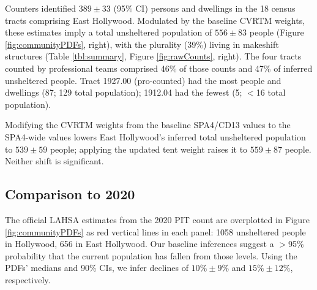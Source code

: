 \documentclass[11pt,twocolumn]{article}
\def\resp{respectively}
\def\dh{10\%\pm9\%}
\def\nce{389}
\def\ne{556\pm83}
\def\de{15\%\pm12\%}
\begin{document}
Counters identified $\nce\pm33$ (95\% CI) persons and dwellings in the 18 census tracts 
comprising East Hollywood. Modulated by the baseline CVRTM weights, these estimates imply 
a total unsheltered population of $\ne$ people (Figure \ref{fig:communityPDFs},
right), with the plurality (39\%) living in makeshift structures (Table \ref{tbl:summary}, 
Figure \ref{fig:rawCounts}, right). The four tracts counted by professional teams comprised 46\% of 
those counts and 47\% of inferred unsheltered people. Tract 1927.00 (pro-counted) had the 
most people and dwellings (87; 129 total population); 1912.04 had the fewest 
(5; $<$16 total population). 

Modifying the CVRTM weights from the baseline SPA4/CD13 values to the SPA4-wide values 
lowers East Hollywood's inferred total unsheltered population to $539\pm59$ people; applying
the updated tent weight raises it to $559\pm87$ people. Neither shift is significant.




\subsection{Comparison to 2020}
\label{sec:comp}

The official LAHSA estimates from the 2020 PIT count are overplotted in Figure \ref{fig:communityPDFs} 
as red vertical lines in each panel: 1058 unsheltered people in Hollywood, 656 in East Hollywood.
Our baseline inferences suggest a $>$95\% probability that the current population has fallen from 
those levels. Using the PDFs' medians and 90\% CIs, we infer declines of $\dh$ and 
$\de$, \resp. 
\end{document}
